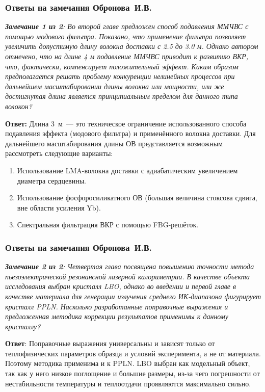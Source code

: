 \begin{frame}
	\justifying 
	\frametitle{Ответы на замечания Обронова~И.В.}
	\small{\textit{\textbf{Замечание 1 из 2}: Во второй главе предложен способ подавления ММЧВС с помощью модового фильтра. Показано, что применение фильтра позволяет увеличить допустимую длину волокна доставки с 2.5 до 3.0 м. Однако автором отмечено, что на длине 4 м подавление ММЧВС приводит к развитию ВКР, что, фактически, компенсирует положительный эффект. Каким образом предполагается решать проблему конкуренции нелинейных процессов при дальнейшем масштабировании длины волокна или мощности, или же достигнутая длина является принципиальным пределом для данного типа волокон?}}
	
	\hfill
	
	\textbf{Ответ:} Длина 3~м~--- это техническое ограничение использованного способа подавления эффекта (модового фильтра) и применённого волокна доставки. Для дальнейшего масштабирования длины ОВ представляется возможным рассмотреть следующие варианты:
	\begin{enumerate}
		\item Использование LMA-волокна доставки с адиабатическим увеличением диаметра сердцевины.
		\item Использование фосфоросиликатного ОВ (большая величина стоксова сдвига, вне области усиления Yb).
		\item Спектральная фильтрация ВКР с помощью FBG-решёток.
	\end{enumerate}
\end{frame}


\begin{frame}
	\frametitle{Ответы на замечания Обронова~И.В.}
	\small{\textit{\textbf{Замечание 2 из 2}: Четвертая глава посвящена повышению точности метода пьезоэлектрической резонансной лазерной калориметрии. В качестве объекта исследования выбран кристалл LBO, однако во введении и первой главе в качестве материала для генерации излучения среднего ИК-диапазона фигурирует кристалл PPLN. Насколько разработанные поправочные выражения и предложенная методика коррекции результатов применимы к данному кристаллу?}}
	
	\hfill
	
	\textbf{Ответ}: Поправочные выражения универсальны и зависят только от теплофизических параметров образца и условий эксперимента, а не от материала. Поэтому методика применима и к PPLN. LBO выбран как модельный объект, так как у него низкое поглощение и большие размеры, из-за чего погрешности от нестабильности температуры и теплоотдачи проявляются максимально сильно.
\end{frame}